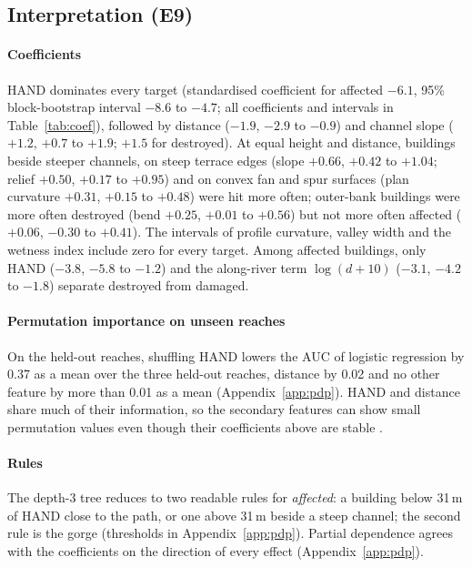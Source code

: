 \documentclass[journal,a4paper]{IEEEtran}
\begin{document}
\subsection{Interpretation (E9)}\label{sec:interp}
\paragraph{Coefficients} HAND dominates every target (standardised coefficient for affected $-6.1$, 95\% block-bootstrap interval $-8.6$ to $-4.7$; all coefficients and intervals in Table~\ref{tab:coef}), followed by distance ($-1.9$, $-2.9$ to $-0.9$) and channel slope ($+1.2$, $+0.7$ to $+1.9$; $+1.5$ for destroyed). At equal height and distance, buildings beside steeper channels, on steep terrace edges (slope $+0.66$, $+0.42$ to $+1.04$; relief $+0.50$, $+0.17$ to $+0.95$) and on convex fan and spur surfaces (plan curvature $+0.31$, $+0.15$ to $+0.48$) were hit more often; outer-bank buildings were more often destroyed (bend $+0.25$, $+0.01$ to $+0.56$) but not more often affected ($+0.06$, $-0.30$ to $+0.41$). The intervals of profile curvature, valley width and the wetness index include zero for every target. Among affected buildings, only HAND ($-3.8$, $-5.8$ to $-1.2$) and the along-river term $\log(d+10)$ ($-3.1$, $-4.2$ to $-1.8$) separate destroyed from damaged.

\paragraph{Permutation importance on unseen reaches} On the held-out reaches, shuffling HAND lowers the AUC of logistic regression by 0.37 as a mean over the three held-out reaches, distance by 0.02 and no other feature by more than 0.01 as a mean (Appendix~\ref{app:pdp}). HAND and distance share much of their information, so the secondary features can show small permutation values even though their coefficients above are stable \citep{molnar2022}.

\paragraph{Rules} The depth-3 tree reduces to two readable rules for \emph{affected}: a building below 31\,m of HAND close to the path, or one above 31\,m beside a steep channel; the second rule is the gorge (thresholds in Appendix~\ref{app:pdp}). Partial dependence agrees with the coefficients on the direction of every effect (Appendix~\ref{app:pdp}).
\end{document}
